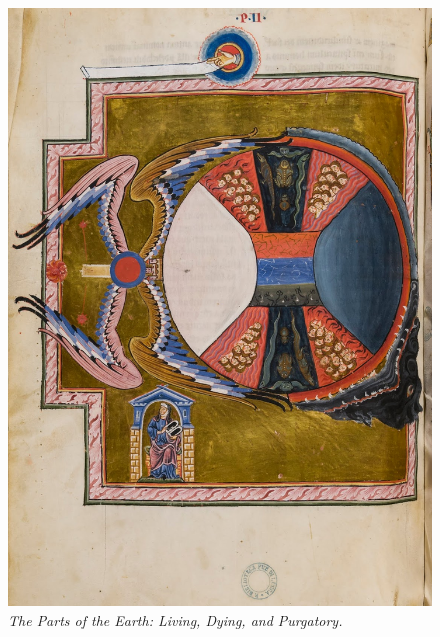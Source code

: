 \documentclass{turabian-researchpaper}
\begin{document}
\begin{figure}
    \includegraphics[scale=0.4]{dragon.jpg}
    \caption{\emph{The Parts of the Earth: Living, Dying, and Purgatory.}\autocite{ISHVBS}}
    \label{The Parts of the Earth}
\end{figure}
\end{document}
